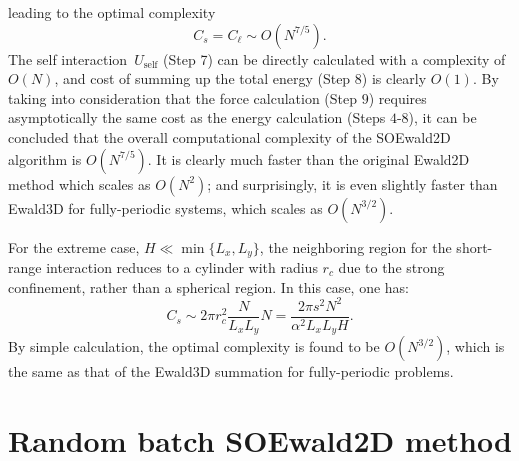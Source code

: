 leading to the optimal complexity
\begin{equation}\label{eq::70}
	C_{s} = C_{\ell} \sim O(N^{7/5}).
\end{equation}
The self interaction~$U_{\text{self}}$ (Step 7) can be directly calculated with a complexity of $O(N)$, and cost of summing up the total energy (Step 8) is clearly $O(1)$.
By taking into consideration that the force calculation (Step $9$) requires asymptotically the same cost as the energy calculation (Steps $4$-$8$), it can be concluded that the overall computational complexity of the SOEwald2D algorithm is $O(N^{7/5})$. 
It is clearly much faster than the original Ewald2D method which scales as $O(N^{2})$; and surprisingly, it is even slightly faster than Ewald3D for fully-periodic systems, which scales as $O(N^{3/2})$.

\begin{rmk}\label{rmk::extreme}
	For the extreme case, $H \ll \min\{L_x,L_y\}$, the neighboring region for the short-range interaction reduces to a cylinder with radius $r_c$ due to the strong confinement, rather than a spherical region. 
	In this case, one has:
	\begin{equation}
		C_{s}\sim 2\pi r_c^2 \frac{N}{L_x L_y} N=\frac{2\pi s^2N^2}{\alpha^2L_x L_y H}.
	\end{equation}
	By simple calculation, the optimal complexity is found to be $O(N^{3/2})$, which is the same as that of the Ewald3D summation for fully-periodic problems. 
\end{rmk}


\section{Random batch SOEwald2D method} \label{sec:rbm}

